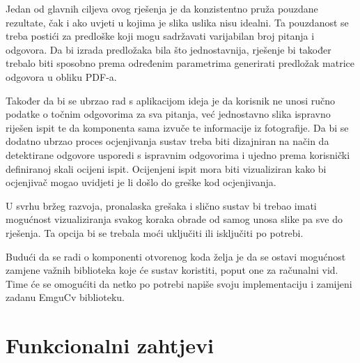 \documentclass{foi}
\begin{document}
Jedan od glavnih ciljeva ovog rješenja je da konzistentno pruža pouzdane rezultate, čak i ako uvjeti u kojima je slika uslika nisu idealni. Ta pouzdanost se treba postići za predloške koji mogu sadržavati varijabilan broj pitanja i odgovora. Da bi izrada predložaka bila što jednostavnija, rješenje bi također trebalo biti sposobno prema određenim parametrima generirati predložak matrice odgovora u obliku PDF-a. 

Također da bi se ubrzao rad s aplikacijom ideja je da korisnik ne unosi ručno podatke o točnim odgovorima za sva pitanja, već jednostavno slika ispravno riješen ispit te da komponenta sama izvuče te informacije iz fotografije. Da bi se dodatno ubrzao proces ocjenjivanja sustav treba biti dizajniran na način da detektirane odgovore usporedi s ispravnim odgovorima i ujedno prema korisnički definiranoj skali ocijeni ispit. Ocijenjeni ispit mora biti vizualiziran kako bi ocjenjivač mogao uvidjeti je li došlo do greške kod ocjenjivanja.

U svrhu bržeg razvoja, pronalaska grešaka i slično sustav bi trebao imati mogućnost vizualiziranja svakog koraka obrade od samog unosa slike pa sve do rješenja. Ta opcija bi se trebala moći uključiti ili isključiti po potrebi. 

Budući da se radi o komponenti otvorenog koda želja je da se ostavi mogućnost zamjene važnih biblioteka koje će sustav koristiti, poput one za računalni vid. Time će se omogućiti da netko po potrebi napiše svoju implementaciju i zamijeni zadanu EmguCv biblioteku.

\pagebreak

\section{Funkcionalni zahtjevi}
\end{document}
